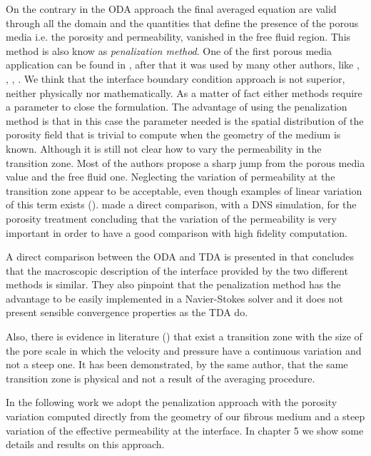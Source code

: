 On the contrary in the ODA approach the final averaged equation are valid through all the domain and the quantities that define the presence of the porous media i.e. the porosity and permeability, vanished in the free fluid region.
This method is also know as \textit{penalization method}. One of the first porous media application can be found in \citet{caltagirone1994interaction}, after that it was used by many other authors, like \citet{bruneau2004passive}, \citet{bruneau2008numerical}, \citet{bruneau2010coupling}, \citet{hussong2011continuum}.
We think that the interface boundary condition approach is not superior, neither physically nor mathematically.
As a matter of fact either methods require a parameter to close the formulation. The advantage of using the penalization method is that in this case the parameter needed is the spatial distribution of the porosity field that is trivial to compute when the geometry of the medium is known.
Although it is still not clear how to vary the permeability in the transition zone. Most of the authors propose a sharp jump from the porous media value and the free fluid one. Neglecting the variation of permeability at the transition zone appear to be acceptable, even though examples of linear variation of this term exists (\citet{caltagirone1994interaction}).
\citet{hussong2011continuum} made a direct comparison, with a DNS simulation, for the porosity treatment concluding that the variation of the permeability is very important in order to have a good comparison with high fidelity computation.

A direct comparison between the ODA and TDA is presented in \citet{cimolin2013navier} that concludes that the macroscopic description of the interface provided by the two different methods is similar. They also pinpoint that the penalization method has the advantage to be easily implemented in a Navier-Stokes solver and it does not present sensible convergence properties as the TDA do.

Also, there is evidence in literature (\citet{ochoa2017fluid}) that exist a transition zone with the size of the pore scale in which the velocity and pressure have a continuous variation and not a steep one. It has been demonstrated, by the same author, that the same transition zone is physical and not a result of the averaging procedure.

In the following work we adopt the penalization approach with the porosity variation computed directly from the geometry of our fibrous medium and a steep variation of the effective permeability at the interface. In chapter 5 we show some details and results on this approach.


